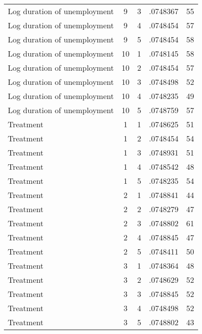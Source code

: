\begin{tabular}{l*{4}{c}}
Log duration of unemployment&           9&           3&    .0748367&          55\\
Log duration of unemployment&           9&           4&    .0748454&          57\\
Log duration of unemployment&           9&           5&    .0748454&          58\\
Log duration of unemployment&          10&           1&    .0748145&          58\\
Log duration of unemployment&          10&           2&    .0748454&          57\\
Log duration of unemployment&          10&           3&    .0748498&          52\\
Log duration of unemployment&          10&           4&    .0748235&          49\\
Log duration of unemployment&          10&           5&    .0748759&          57\\
Treatment           &           1&           1&    .0748625&          51\\
Treatment           &           1&           2&    .0748454&          54\\
Treatment           &           1&           3&    .0748931&          51\\
Treatment           &           1&           4&    .0748542&          48\\
Treatment           &           1&           5&    .0748235&          54\\
Treatment           &           2&           1&    .0748841&          44\\
Treatment           &           2&           2&    .0748279&          47\\
Treatment           &           2&           3&    .0748802&          61\\
Treatment           &           2&           4&    .0748845&          47\\
Treatment           &           2&           5&    .0748411&          50\\
Treatment           &           3&           1&    .0748364&          48\\
Treatment           &           3&           2&    .0748629&          52\\
Treatment           &           3&           3&    .0748845&          52\\
Treatment           &           3&           4&    .0748498&          52\\
Treatment           &           3&           5&    .0748802&          43\\

\end{tabular}
